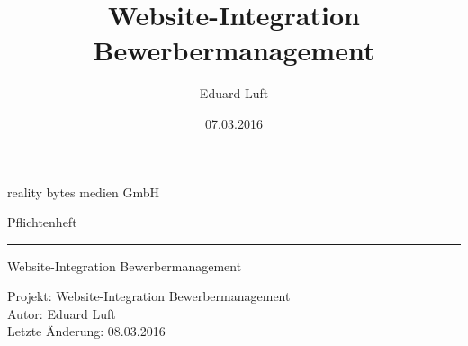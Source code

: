 \documentclass[12pt]{extarticle}
\title{Website-Integration Bewerbermanagement}
\author{Eduard Luft}
\date{07.03.2016}
\begin{document}
    \begin{titlepage}

        \centering
        \Huge
        reality bytes medien GmbH

        \vspace{4cm}
        Pflichtenheft

        \noindent\rule{12cm}{0.5pt}

        \vspace{5mm}
        \textcolor{grew}{
            Website-Integration Bewerbermanagement
        }

        \vfill
        \raggedright
        \linespread{1.6}
        \Large
        Projekt: Website-Integration Bewerbermanagement \\
        Autor: Eduard Luft \\
        Letzte Änderung: 08.03.2016
    \end{titlepage}


    \tableofcontents

    \clearpage

    
    
    
    
    
    
    
    
    
    
    
    
    
    
\end{document}
